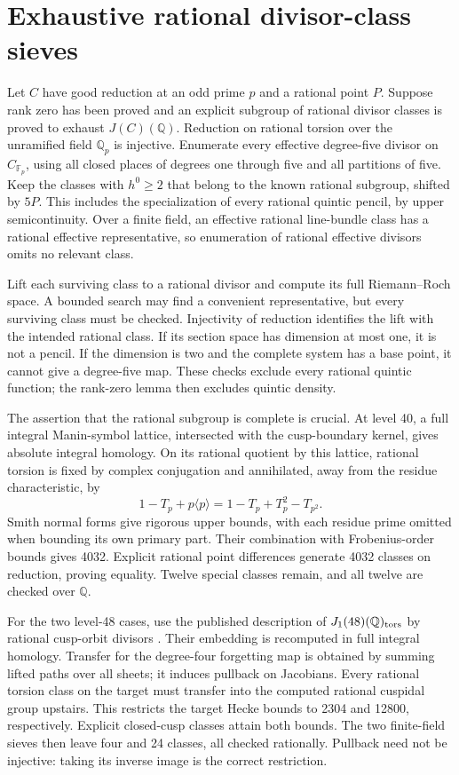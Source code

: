 \documentclass[11pt]{article}
\newcommand{\Q}{\mathbb Q}
\newcommand{\Fp}{\mathbb F_p}
\theoremstyle{remark}\newtheorem{remark}[theorem]{Remark}
\begin{document}
\section{Exhaustive rational divisor-class sieves}
Let $C$ have good reduction at an odd prime $p$ and a rational point $P$.
Suppose rank zero has been proved and an explicit subgroup of rational
divisor classes is proved to exhaust $J(C)(\Q)$. Reduction on rational
torsion over the unramified field $\Q_p$ is injective. Enumerate every
effective degree-five divisor on $C_{\Fp}$, using all closed places of
degrees one through five and all partitions of five. Keep the classes
with $h^0\ge2$ that belong to the known rational subgroup, shifted by
$5P$. This includes the specialization of every rational quintic pencil,
by upper semicontinuity. Over a finite field, an effective rational
line-bundle class has a rational effective representative, so enumeration
of rational effective divisors omits no relevant class.

Lift each surviving class to a rational divisor and compute its full
Riemann--Roch space. A bounded search may find a convenient representative,
but every surviving class must be checked. Injectivity of reduction
identifies the lift with the intended rational class. If its section
space has dimension at most one, it is not a pencil. If the dimension
is two and the complete system has a base point, it cannot give a
degree-five map. These checks exclude every rational quintic function;
the rank-zero lemma then excludes quintic density.

The assertion that the rational subgroup is complete is crucial.
At level 40, a full integral Manin-symbol lattice, intersected with the
cusp-boundary kernel, gives absolute integral homology. On its rational
quotient by this lattice, rational torsion is fixed by complex conjugation
and annihilated, away from the residue characteristic, by
\[
 1-T_p+p\langle p\rangle=1-T_p+T_p^2-T_{p^2}.
\]
Smith normal forms give rigorous upper bounds, with each residue prime
omitted when bounding its own primary part. Their combination with
Frobenius-order bounds gives 4032. Explicit rational point differences
generate 4032 classes on reduction, proving equality. Twelve special
classes remain, and all twelve are checked over $\Q$.

For the two level-48 cases, use the published description of
$J_1(48)(\Q)_{\rm tors}$ by rational cusp-orbit divisors
\cite[Theorem 4.13]{DEH}. Their embedding
is recomputed in full integral homology. Transfer for the degree-four
forgetting map is obtained by summing lifted paths over all sheets;
it induces pullback on Jacobians. Every rational torsion class on the
target must transfer into the computed rational cuspidal group upstairs.
This restricts the target Hecke bounds to 2304 and 12800, respectively.
Explicit closed-cusp classes attain both bounds. The two finite-field
sieves then leave four and 24 classes, all checked rationally. Pullback
need not be injective: taking its inverse image is the correct restriction.
\end{document}
